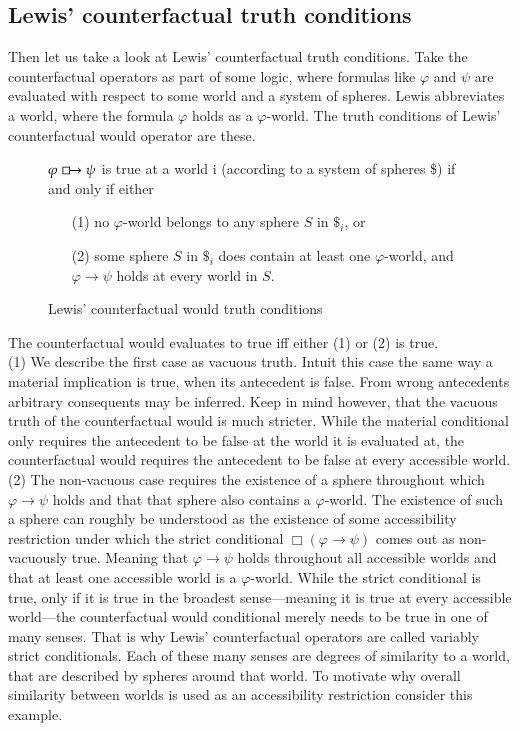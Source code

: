 \documentclass[a4paper,american]{paper}
\theoremstyle{definition}\newtheorem{definition}{Definition}
\begin{document}
\subsection{Lewis' counterfactual truth conditions}
Then let us take a look at Lewis' counterfactual truth conditions. Take the counterfactual operators as part of some logic, where formulas like $\varphi$ and $\psi$ are evaluated with respect to some world and a system of spheres. Lewis abbreviates a world, where the formula $\varphi$ holds as a $\varphi$-world. The truth conditions of Lewis' counterfactual would operator are these.
\begin{figure}[H]
	\centering
	$\varphi\boxright\psi$ is true at a world i (according to a system of spheres \$) if and only if either
	\begin{itemize}
	\item[(1)] no $\varphi$-world belongs to any sphere $S$ in $\$_i$, or
	\item[(2)] some sphere $S$ in $\$_i$ does contain at least one $\varphi$-world, and $\varphi\rightarrow\psi$ holds at every world in $S$.
	\end{itemize}
	\caption{Lewis' counterfactual would truth conditions}
	\label{fig:counterfactual_would}
\end{figure}
\noindent The counterfactual would evaluates to true iff either (1) or (2) is true.\\
\indent (1) We describe the first case as vacuous truth. Intuit this case the same way a material implication is true, when its antecedent is false. From wrong antecedents arbitrary consequents may be inferred. Keep in mind however, that the vacuous truth of the counterfactual would is much stricter. While the material conditional only requires the antecedent to be false at the world it is evaluated at, the counterfactual would requires the antecedent to be false at every accessible world.\\
\indent (2) The non-vacuous case requires the existence of a sphere throughout which $\varphi\rightarrow\psi$ holds and that that sphere also contains a $\varphi$-world. The existence of such a sphere can roughly be understood as the existence of some accessibility restriction under which the strict conditional $\Box (\varphi\rightarrow\psi)$ comes out as non-vacuously true. Meaning that $\varphi\rightarrow\psi$ holds throughout all accessible worlds and that at least one accessible world is a $\varphi$-world. While the strict conditional is true, only if it is true in the broadest sense---meaning it is true at every accessible world---the counterfactual would conditional merely needs to be true in one of many senses. That is why Lewis' counterfactual operators are called variably strict conditionals. Each of these many senses are degrees of similarity to a world, that are described by spheres around that world. To motivate why overall similarity between worlds is used as an accessibility restriction consider this example.
\end{document}
